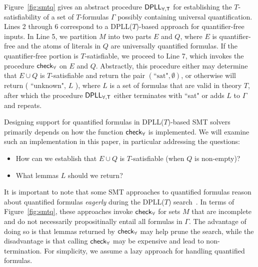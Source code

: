 \documentclass[oribibl]{llncs}
\begin{document}
Figure~\ref{fig:smtq} gives an abstract procedure $\small\mathsf{DPLL_{\forall, T}}$
for establishing the $T$-satisfiability of a set of $T$-formulas $\Gamma$ possibly containing universal quantification.
Lines 2 through 6 correspond to a DPLL($T$)-based approach for quantifier-free inputs.
In Line 5, we partition $M$ into two parts $E$ and $Q$,
where $E$ is quantifier-free and the atoms of literals in $Q$ are universally quantified formulas.
If the quantifier-free portion is $T$-satisfiable,
we proceed to Line 7, which invokes the procedure $\small\mathsf{check}_\forall$ on $E$ and $Q$.
Abstractly, this procedure either may determine that $E \cup Q$ is $T$-satisfiable and return the pair $( \text{``sat"}, \emptyset )$,
or otherwise will return ( ``unknown", $L$ ), where $L$ is a set of formulas that are valid in theory $T$,
after which the procedure $\small\mathsf{DPLL_{\forall, T}}$ either terminates with ``sat" or adds $L$ to $\Gamma$ and repeats.

Designing support for quantified formulas in DPLL($T$)-based SMT solvers 
primarily depends on how the function $\small\mathsf{check}_\forall$ is implemented.
We will examine such an implementation in this paper, in particular addressing the questions:
\begin{itemize}
\item How can we establish that $E \cup Q$ is $T$-satisfiable (when $Q$ is non-empty)?
\item What lemmas $L$ should we return?
\end{itemize}

It is important to note that some SMT approaches to quantified formulas
reason about quantified formulas \emph{eagerly} during the DPLL($T$) search~\cite{}.
In terms of Figure~\ref{fig:smtq}, these approaches invoke $\small\mathsf{check}_\forall$
for sets $M$ that are incomplete and do not necessarily propositinally entail all formulas in $\Gamma$.
The advantage of doing so is that lemmas returned by $\small\mathsf{check}_\forall$ may help prune the search,
while the disadvantage is that calling $\small\mathsf{check}_\forall$ may be expensive and lead to non-termination.
For simplicity, we assume a lazy approach for handling quantified formulas.
\end{document}
